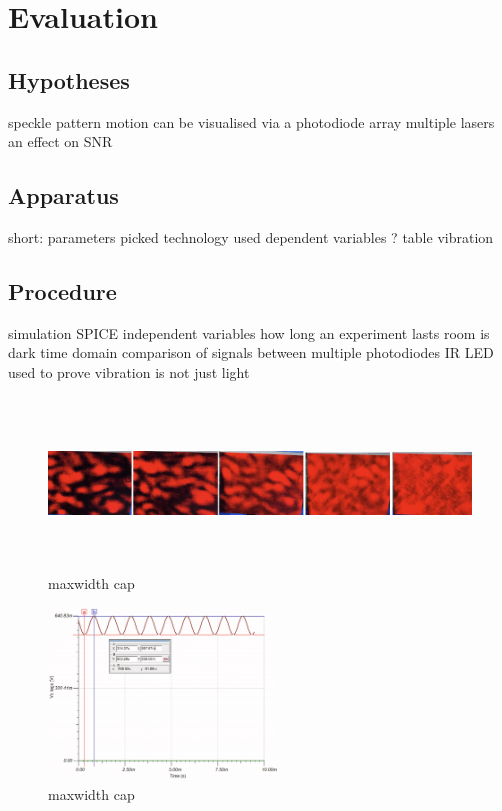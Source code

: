 \section{Evaluation}
\label{sec:evaluation}

\subsection{Hypotheses}
speckle pattern motion can be visualised via a photodiode array
multiple lasers an effect on SNR


\subsection{Apparatus}
short:
parameters picked
technology used
dependent variables ? 
table vibration

\subsection{Procedure}
simulation SPICE
independent variables
how long an experiment lasts 
room is dark
time domain comparison of signals between multiple photodiodes
IR LED used to prove vibration is not just light


\begin{figure}[t]
    \centering
    \includegraphics[width=\textwidth,height=1.8in]{figures/eval/wide}
    \caption{maxwidth cap}
    \label{fig:header}
  \end{figure}
  

\begin{figure}[t]
    \centering
    \includegraphics[width=\textwidth,height=1.8in]{figures/eval/transient}
    \caption{maxwidth cap}
    \label{fig:header}
  \end{figure}
  